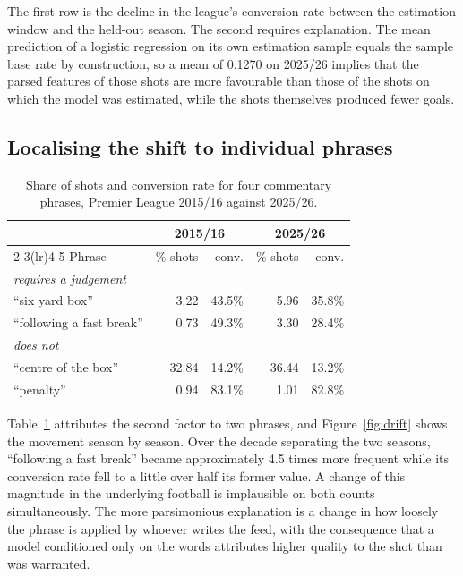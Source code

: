 \documentclass[conference]{IEEEtran}
\newcommand{\num}[1]{\mbox{#1}}
\begin{document}
\noindent
The first row is the decline in the league's conversion rate between the
estimation window and the held-out season. The second requires explanation.
The mean prediction of a logistic regression on its own estimation sample
equals the sample base rate by construction, so a mean of \num{0.1270} on
2025/26 implies that the parsed features of those shots are more favourable
than those of the shots on which the model was estimated, while the shots
themselves produced fewer goals.

\subsection{Localising the shift to individual phrases}

\begin{table}[t]
\caption{Share of shots and conversion rate for four commentary phrases,
Premier League 2015/16 against 2025/26.}
\label{tab:drift}
\centering
\footnotesize
\begin{tabular}{lrrrr}
\toprule
& \multicolumn{2}{c}{2015/16} & \multicolumn{2}{c}{2025/26} \\
\cmidrule(lr){2-3}\cmidrule(lr){4-5}
Phrase & \% shots & conv. & \% shots & conv. \\
\midrule
\multicolumn{5}{l}{\emph{requires a judgement}} \\
``six yard box''      & 3.22 & 43.5\% & 5.96 & 35.8\% \\
``following a fast break'' & 0.73 & 49.3\% & 3.30 & 28.4\% \\
\midrule
\multicolumn{5}{l}{\emph{does not}} \\
``centre of the box'' & 32.84 & 14.2\% & 36.44 & 13.2\% \\
``penalty''           & 0.94 & 83.1\% & 1.01 & 82.8\% \\
\bottomrule
\end{tabular}
\end{table}

Table~\ref{tab:drift} attributes the second factor to two phrases, and
Figure~\ref{fig:drift} shows the movement season by season. Over the decade
separating the two seasons, ``following a fast break'' became approximately 4.5
times more frequent while its conversion rate fell to a little over half its
former value. A change of this magnitude in the underlying football is
implausible on both counts simultaneously. The more parsimonious explanation is
a change in how loosely the phrase is applied by whoever writes the feed, with
the consequence that a model conditioned only on the words attributes higher
quality to the shot than was warranted.
\end{document}
